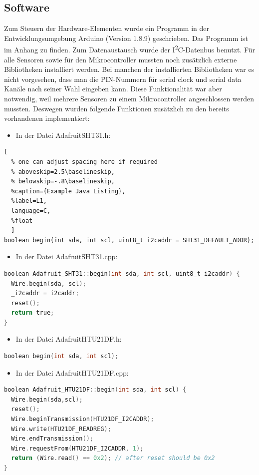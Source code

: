 \documentclass[runningheads]{llncs}
\begin{document}
\subsection{Software}
Zum Steuern der Hardware-Elementen wurde ein Programm in der Entwicklungsumgebung Arduino (Version 1.8.9)  geschrieben. Das Programm ist im Anhang zu finden. Zum Datenaustausch wurde der I\textsuperscript{2}C-Datenbus benutzt. Für alle Sensoren sowie für den Mikrocontroller mussten noch zusätzlich externe Bibliotheken installiert werden. Bei manchen der installierten Bibliotheken war es nicht vorgesehen, dass man die PIN-Nummern für serial clock und serial data Kanäle nach seiner Wahl eingeben kann. Diese Funktionalität war aber notwendig, weil mehrere Sensoren zu einem Mikrocontroller angeschlossen werden mussten. Deswegen wurden folgende Funktionen zusätzlich zu den bereits vorhandenen implementiert:
\begin{itemize}
\item In der Datei Adafruit\textunderscore SHT31.h:
\end{itemize}
\begin{lstlisting}[
  % one can adjust spacing here if required
  % aboveskip=2.5\baselineskip,
  % belowskip=-.8\baselineskip,
  %caption={Example Java Listing},
  %label=L1,
  language=C,
  %float
  ]
boolean begin(int sda, int scl, uint8_t i2caddr = SHT31_DEFAULT_ADDR);
\end{lstlisting}
\begin{itemize}
\item In der Datei Adafruit\textunderscore SHT31.cpp:
\end{itemize}
\begin{lstlisting}[language=C]
boolean Adafruit_SHT31::begin(int sda, int scl, uint8_t i2caddr) {
  Wire.begin(sda, scl);
  _i2caddr = i2caddr;
  reset();
  return true;
}
\end{lstlisting}
\begin{itemize}
\item In der Datei Adafruit\textunderscore HTU21DF.h:
\end{itemize}
\begin{lstlisting}[language=C]
boolean begin(int sda, int scl);
\end{lstlisting}
\begin{itemize}
\item In der Datei Adafruit\textunderscore HTU21DF.cpp:
\end{itemize}
\begin{lstlisting}[language=C]
boolean Adafruit_HTU21DF::begin(int sda, int scl) {
  Wire.begin(sda,scl);
  reset();
  Wire.beginTransmission(HTU21DF_I2CADDR);
  Wire.write(HTU21DF_READREG);
  Wire.endTransmission();
  Wire.requestFrom(HTU21DF_I2CADDR, 1);
  return (Wire.read() == 0x2); // after reset should be 0x2
}
\end{lstlisting}
\end{document}
